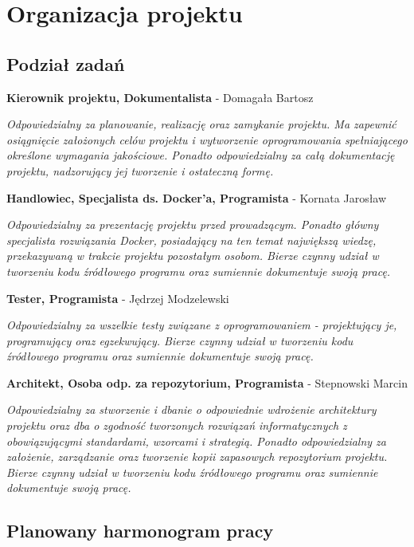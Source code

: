 \chapter[Organizacja projektu]{Organizacja projektu}
\section[Podział zadań]{Podział zadań}

\par{\textbf{Kierownik projektu, Dokumentalista} - Domagała Bartosz}

\par{\textit{Odpowiedzialny za planowanie, realizację oraz zamykanie projektu. Ma zapewnić osiągnięcie założonych celów projektu i wytworzenie oprogramowania spełniającego określone wymagania jakościowe. Ponadto odpowiedzialny za całą dokumentację projektu, nadzorujący jej tworzenie i ostateczną formę.}}



\par{\textbf{Handlowiec, Specjalista ds. Docker'a, Programista} - Kornata Jarosław}
\par{\textit{Odpowiedzialny za prezentację projektu przed prowadzącym. Ponadto główny specjalista rozwiązania Docker, posiadający na ten temat największą wiedzę, przekazywaną w trakcie projektu pozostałym osobom. Bierze czynny udział w tworzeniu kodu źródłowego programu oraz sumiennie dokumentuje swoją pracę.}}


\par{\textbf{Tester, Programista} - Jędrzej Modzelewski}
\par{\textit{Odpowiedzialny za wszelkie testy związane z oprogramowaniem - projektujący je, programujący oraz egzekwujący. Bierze czynny udział w tworzeniu kodu źródłowego programu oraz sumiennie dokumentuje swoją pracę.}}

\par{\textbf{Architekt, Osoba odp. za repozytorium, Programista} - Stepnowski Marcin}
\par{\textit{Odpowiedzialny za stworzenie i dbanie o odpowiednie wdrożenie architektury projektu oraz dba o zgodność tworzonych rozwiązań informatycznych z obowiązującymi standardami, wzorcami i strategią. Ponadto odpowiedzialny za założenie, zarządzanie oraz tworzenie kopii zapasowych repozytorium projektu. Bierze czynny udział w tworzeniu kodu źródłowego programu oraz sumiennie dokumentuje swoją pracę.}}


\section[Planowany harmonogram pracy]{Planowany harmonogram pracy}

